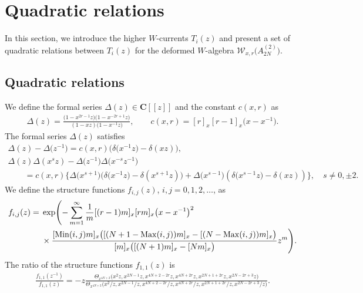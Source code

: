 \documentclass[10pt,a4paper]{amsart}
\numberwithin{equation}{section}
\begin{document}
\section{Quadratic relations}
\label{section:3}

In this section, we introduce the higher $W$-currents $T_i(z)$ and present
a set of quadratic relations {between}
$T_i(z)$ for the deformed $W$-algebra
${\mathcal W}_{x,r}\big(A_{2N}^{(2)}\big)$.


\subsection{Quadratic relations}

We define the formal series
$\Delta(z)\in {\mathbf C}[[z]]$ and the constant $c(x,r)$ as
\begin{gather*}
\Delta(z)=\frac{\big(1-x^{2r-1}z\big)\big(1-x^{-2r+1}z\big)}{(1-xz)\big(1-x^{-1}z\big)},\qquad
c(x,r)=[r]_x[r-1]_x\big(x-x^{-1}\big).
\end{gather*}
The formal series $\Delta(z)$ satisfies
\begin{gather*}
\Delta(z)-\Delta\big(z^{-1}\big)=c(x,r)\big(\delta\big(x^{-1}z\big)-\delta(xz)\big),
\\
\Delta(z)\Delta(x^sz)-\Delta\big(z^{-1}\big)\Delta\big(x^{-s}z^{-1}\big)
\\ \qquad\!
{}=c(x,r)\big\{\Delta\big(x^{s+1}\big)\big(\delta\big(x^{-1}z\big)-\delta(x^{s+1}z)\big)
+\Delta\big(x^{s-1}\big)(\delta\big(x^{s-1}z\big)-\delta(xz))\big\},\quad
s \neq 0, \pm2.
\end{gather*}
We define the structure functions $f_{i,j}(z)$, $i, j=0,1,2,\dots$, as
\begin{align}
f_{i,j}(z)={} &\exp\Biggl({-}\sum_{m=1}^\infty
\frac{1}{m}[(r-1)m]_x[rm]_x\big(x-x^{-1}\big)^2\notag
\\
&
{} \times\frac{[\operatorname{Min}(i,j)m]_x
\big([(N+1-\operatorname{Max}(i,j))m]_x-[(N-\operatorname{Max}(i,j))m]_x\big)
}{[m]_x\big([(N+1)m]_x-[Nm]_x\big)}z^m\Biggr).
\label{def:fij}
\end{align}
The ratio of the structure functions $f_{1,1}(z)$ is
\begin{gather*}
\frac{f_{1,1}(z^{-1})}{f_{1,1}(z)}=-z
\frac{\Theta_{x^{4N+2}}\big(x^2z, x^{2N-1}z, x^{4N+2-2r}z, x^{4N+2r}z, x^{2N+1+2r}z,x^{2N-2r+3}z\big)}
{\Theta_{x^{4N+2}}\big(x^2/z, x^{2N-1}/z, x^{4N+2-2r}/z, x^{4N+2r}/z, x^{2N+1+2r}/z, x^{2N-2r+3}/z\big)}.
\end{gather*}
\end{document}
